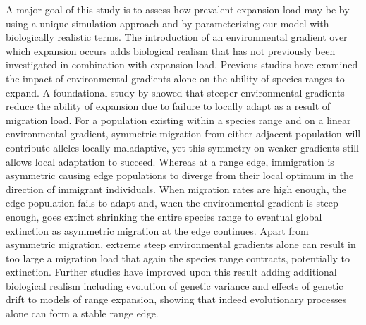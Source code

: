 A major goal of this study is to assess how prevalent expansion load may be by using a unique simulation approach and by parameterizing our model with biologically realistic terms. The introduction of an environmental gradient over which expansion occurs adds biological realism that has not previously been investigated in combination with expansion load. Previous studies have examined the impact of environmental gradients alone on the ability of species ranges to expand. A foundational study by \citet{Kirkpatrick:1997} showed that steeper environmental gradients reduce the ability of expansion due to failure to locally adapt as a result of migration load. For a population existing within a species range and on a linear environmental gradient, symmetric migration from either adjacent population will contribute alleles locally maladaptive, yet this symmetry on weaker gradients still allows local adaptation to succeed. Whereas at a range edge, immigration is asymmetric causing edge populations to diverge from their local optimum in the direction of immigrant individuals. When migration rates are high enough, the edge population fails to adapt and, when the environmental gradient is steep enough, goes extinct shrinking the entire species range to eventual global extinction as asymmetric migration at the edge continues. Apart from asymmetric migration, extreme steep environmental gradients alone can result in too large a migration load that again the species range contracts, potentially to extinction. Further studies \citep{Barton:2001, Polechova:2015} have improved upon this result adding additional biological realism including evolution of genetic variance and effects of genetic drift to models of range expansion, showing that indeed evolutionary processes alone can form a stable range edge. %



